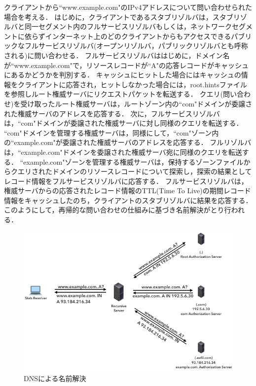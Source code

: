 クライアントから``www.example.com"のIPv4アドレスについて問い合わせられた場合を考える．
はじめに，クライアントであるスタブリゾルバは，スタブリゾルバと同一セグメント内のフルサービスリゾルバもしくは，ネットワークセグメントに依らずインターネット上のどのクライアントからもアクセスできるパブリックなフルサービスリゾルバ(オープンリゾルバ，パブリックリゾルバとも呼称される)に問い合わせる．
フルサービスリゾルバははじめに，ドメイン名が``www.example.com"で，リソースレコードが``A"の応答レコードがキャッシュにあるかどうかを判別する．
キャッシュにヒットした場合にはキャッシュの情報をクライアントに応答され，ヒットしなかった場合には，root.hintsファイルを参照しルート権威サーバにリクエストパケットを転送する．
クエリ(問い合わせ)を受け取ったルート権威サーバは，ルートゾーン内の``com"ドメインが委譲された権威サーバのアドレスを応答する．
次に，フルサービスリゾルバは，``com"ドメインが委譲された権威サーバに対し同様のクエリを転送する．
``com"ドメインを管理する権威サーバは，同様にして，``com"ゾーン内の``example.com"が委譲された権威サーバのアドレスを応答する．
フルリゾルバは，``example.com"ドメインを委譲された権威サーバ宛に同様のクエリを転送する．
``example.com"ゾーンを管理する権威サーバは，保持するゾーンファイルからクエリされたドメインのリソースレコードについて探索し，探索の結果としてレコード情報をフルサービスリゾルバに応答する．
フルサービスリゾルバは，権威サーバからの応答されたレコード情報のTTL(Time To Live)の期間レコード情報をキャッシュしたのち，クライアントのスタブリゾルバに結果を応答する．
このようにして，再帰的な問い合わせの仕組みに基づき名前解決がとり行われる．

\begin{figure}[h]
 \centering
 \includegraphics[width=12.0cm]{figure/dns-name-resolution.png}
 \caption{DNSによる名前解決}
 \label{fig:dns-name-resolution}
\end{figure}

